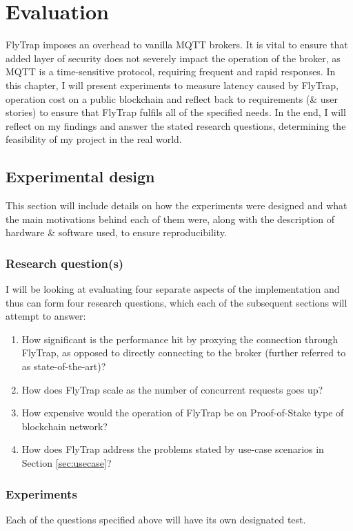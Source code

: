 \chapter{Evaluation}\label{chap:evaluation}
FlyTrap imposes an overhead to vanilla MQTT brokers. It is vital to ensure that added layer of security does not severely impact the operation of the broker, as MQTT is a time-sensitive protocol, requiring frequent and rapid responses. In this chapter, I will present experiments to measure latency caused by FlyTrap, operation cost on a public blockchain and reflect back to requirements (\& user stories) to ensure that FlyTrap fulfils all of the specified needs. In the end, I will reflect on my findings and answer the stated research questions, determining the feasibility of my project in the real world.

\section{Experimental design}
This section will include details on how the experiments were designed and what the main motivations behind each of them were, along with the description of hardware \& software used, to ensure reproducibility.
\subsection{Research question(s)}
I will be looking at evaluating four separate aspects of the implementation and thus can form four research questions, which each of the subsequent sections will attempt to answer:
\begin{enumerate}
  \item How significant is the performance hit by proxying the connection through FlyTrap, as opposed to directly connecting to the broker (further referred to as state-of-the-art)?
  \item How does FlyTrap scale as the number of concurrent requests goes up?
  \item How expensive would the operation of FlyTrap be on Proof-of-Stake type of blockchain network?
  \item How does FlyTrap address the problems stated by use-case scenarios in Section \ref{sec:usecase}?
\end{enumerate}
\subsection{Experiments}
Each of the questions specified above will have its own designated test.

